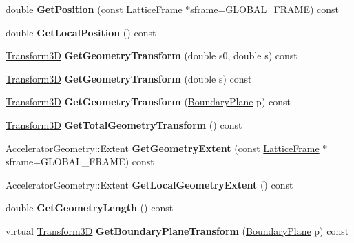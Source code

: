 \begin{DoxyCompactItemize}
double {\bfseries Get\+Position} (const \hyperlink{classLatticeFrame}{Lattice\+Frame} $\ast$sframe=G\+L\+O\+B\+A\+L\+\_\+\+F\+R\+A\+ME) const
\item 
\mbox{\label{classLatticeFrame_a6a74ea0f6b4ac03c4d386710f359e255}} 
double {\bfseries Get\+Local\+Position} () const
\item 
\mbox{\label{classLatticeFrame_a9c864cf033c8c926629951cf8b7639fb}} 
\hyperlink{classTransform3D}{Transform3D} {\bfseries Get\+Geometry\+Transform} (double s0, double s) const
\item 
\mbox{\label{classLatticeFrame_ab5f38910a4b098750ec5624cbaf9dbbd}} 
\hyperlink{classTransform3D}{Transform3D} {\bfseries Get\+Geometry\+Transform} (double s) const
\item 
\mbox{\label{classLatticeFrame_aa088b1814f9c1945cd254fac94517164}} 
\hyperlink{classTransform3D}{Transform3D} {\bfseries Get\+Geometry\+Transform} (\hyperlink{classAcceleratorGeometry_a5c1661938176102f235836f5a8be6034}{Boundary\+Plane} p) const
\item 
\mbox{\label{classLatticeFrame_a3c9139ef029cb7187d83c23c6c528207}} 
\hyperlink{classTransform3D}{Transform3D} {\bfseries Get\+Total\+Geometry\+Transform} () const
\item 
\mbox{\label{classLatticeFrame_a5496f26d6e6105cd5b710306bd7faa84}} 
Accelerator\+Geometry\+::\+Extent {\bfseries Get\+Geometry\+Extent} (const \hyperlink{classLatticeFrame}{Lattice\+Frame} $\ast$sframe=G\+L\+O\+B\+A\+L\+\_\+\+F\+R\+A\+ME) const
\item 
\mbox{\label{classLatticeFrame_a88527971d05930174ee88f4e5010e786}} 
Accelerator\+Geometry\+::\+Extent {\bfseries Get\+Local\+Geometry\+Extent} () const
\item 
\mbox{\label{classLatticeFrame_a5243ecf1b657c69362b6f33f5abc92e2}} 
double {\bfseries Get\+Geometry\+Length} () const
\item 
\mbox{\label{classLatticeFrame_a83cd6eb39c55759acb4d9bdd108359ed}} 
virtual \hyperlink{classTransform3D}{Transform3D} {\bfseries Get\+Boundary\+Plane\+Transform} (\hyperlink{classAcceleratorGeometry_a5c1661938176102f235836f5a8be6034}{Boundary\+Plane} p) const

\end{DoxyCompactItemize}
